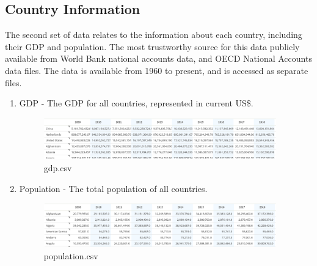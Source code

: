 \documentclass[a4 paper, 12pt]{article}
\begin{document}
    \subsection{Country Information}
    The second set of data relates to the information about each country, including their GDP and population. The most trustworthy source for this data publicly available from World Bank national accounts data, and OECD National Accounts data files. The data is available from 1960 to present, and is accessed as separate files. 
        \begin{enumerate}
            \item GDP - The GDP for all countries, represented in current US\$.
                \begin{figure} [H]
                    \centering
                    \includegraphics[width=0.95\textwidth, frame]
                        {./images/gdp_data.png}
                        \caption{gdp.csv}                    
                \end{figure}
            \item Population - The total population of all countries.
                \begin{figure} [H]
                    \centering
                    \includegraphics[width=0.95\textwidth, frame]
                        {./images/pop_data.png}      
                        \caption{population.csv} 
                \end{figure} 
        \end{enumerate}
\end{document}
